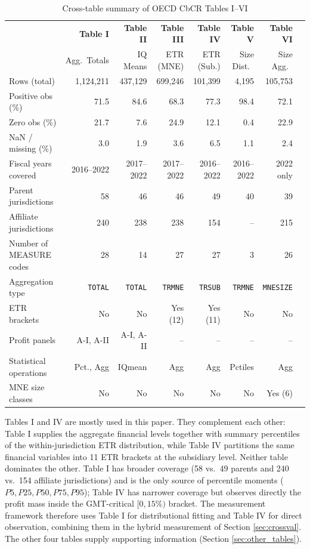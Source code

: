 \documentclass[11pt,a4paper]{article}
\newcommand{\code}[1]{\texttt{#1}}
\begin{document}
\begin{table}[H]
\centering
\caption{Cross-table summary of OECD CbCR Tables I--VI}
\label{tab:crosssummary}
\footnotesize
\begin{tabular}{@{}lrrrrrrr@{}}
\toprule
 & \textbf{Table I} & \textbf{Table II} & \textbf{Table III} & \textbf{Table IV} & \textbf{Table V} & \textbf{Table VI} \\
 & Agg.\ Totals & IQ Means & ETR (MNE) & ETR (Sub.) & Size Dist.\ & Size Agg.\ \\
\midrule
Rows (total) & 1,124,211 & 437,129 & 699,246 & 101,399 & 4,195 & 105,753 \\
Positive obs (\%) & 71.5 & 84.6 & 68.3 & 77.3 & 98.4 & 72.1 \\
Zero obs (\%) & 21.7 & 7.6 & 24.9 & 12.1 & 0.4 & 22.9 \\
NaN / missing (\%) & 3.0 & 1.9 & 3.6 & 6.5 & 1.1 & 2.4 \\
\addlinespace
Fiscal years covered & 2016--2022 & 2017--2022 & 2017--2022 & 2016--2022 & 2016--2022 & 2022 only \\
Parent jurisdictions & 58 & 46 & 46 & 49 & 40 & 39 \\
Affiliate jurisdictions & 240 & 238 & 238 & 154 & -- & 215 \\
Number of MEASURE codes & 28 & 14 & 27 & 27 & 3 & 26 \\
\addlinespace
Aggregation type & \code{TOTAL} & \code{TOTAL} & \code{TRMNE} & \code{TRSUB} & \code{TRMNE} & \code{MNESIZE} \\
ETR brackets & No & No & Yes (12) & Yes (11) & No & No \\
Profit panels & A-I, A-II & A-I, A-II & -- & -- & -- & -- \\
Statistical operations & Pct., Agg & IQmean & Agg & Agg & Pctiles & Agg \\
MNE size classes & No & No & No & No & No & Yes (6) \\
\bottomrule
\end{tabular}
\end{table}

Tables I and IV are mostly used in this paper. They complement each other: Table I supplies the aggregate financial levels together with summary percentiles of the within-jurisdiction ETR distribution, while Table IV partitions the same financial variables into 11 ETR brackets at the subsidiary level. Neither table dominates the other. Table I has broader coverage (58 vs.\ 49 parents and 240 vs.\ 154 affiliate jurisdictions) and is the only source of percentile moments ($P5, P25, P50, P75, P95$); Table IV has narrower coverage but observes directly the profit mass inside the GMT-critical $[0, 15\%)$ bracket. The measurement framework therefore uses Table I for distributional fitting and Table IV for direct observation, combining them in the hybrid measurement of Section \ref{sec:crossval}. The other four tables supply supporting information (Section \ref{sec:other_tables}).
\end{document}
